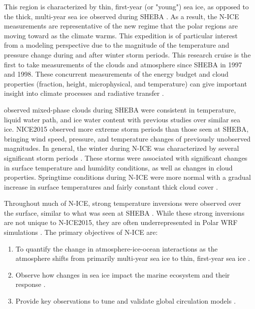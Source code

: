 This region is characterized by thin, first-year (or "young") sea ice, as opposed to the thick, multi-year sea ice observed during SHEBA \citep{cohen:2017}. As a result, the N-ICE measurements are representative of the new regime that the polar regions are moving toward as the climate warms. This expedition is of particular interest from a modeling perspective due to the magnitude of the temperature and pressure change during and after winter storm periods. This research cruise is the first to take measurements of the clouds and atmosphere since SHEBA in 1997 and 1998. These concurrent measurements of the energy budget and cloud properties (fraction, height, microphysical, and temperature) can give important insight into climate processes and radiative transfer \citep{persson:2002, schweiger:2004}. 

\citet{shupe:2004} observed mixed-phase clouds during SHEBA were consistent in temperature, liquid water path, and ice water content with previous studies over similar sea ice. NICE2015 observed more extreme storm periods than those seen at SHEBA, bringing wind speed, pressure, and temperature changes of previously unobserved magnitudes. In general, the winter during N-ICE was characterized by several significant storm periods \citet{cohen:2017}. These storms were associated with significant changes in surface temperature and humidity conditions, as well as changes in cloud properties. Springtime conditions during N-ICE were more normal with a gradual increase in surface temperatures and fairly constant thick cloud cover \citet{cohen:2017}.

Throughout much of N-ICE, strong temperature inversions were observed over the surface, similar to what was seen at SHEBA \citep{kayser:2017}. While these strong inversions are not unique to N-ICE2015, they are often underrepresented in Polar WRF simulations \citep{hines:2015}. 
\newline \newline
\noindent The primary objectives of N-ICE are:
\begin{enumerate}
    \item To quantify the change in atmosphere-ice-ocean interactions as the atmosphere shifts from primarily multi-year sea ice to thin, first-year sea ice \citep{granskog:2018, granskog:2015}. 
    \item Observe how changes in sea ice impact the marine ecosystem and their response \citep{granskog:2015}.
    \item Provide key observations to tune and validate global circulation models \citep{granskog:2018, granskog:2015}.
\end{enumerate}

